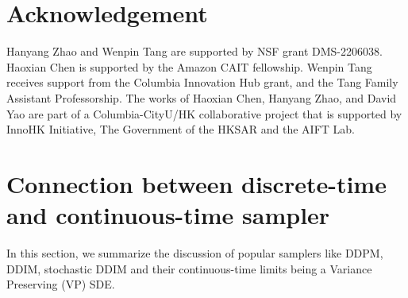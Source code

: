 \documentclass{article}
\theoremstyle{plain}
\theoremstyle{definition}
\theoremstyle{remark}
\begin{document}
\section*{Acknowledgement}
Hanyang Zhao and Wenpin Tang are supported by NSF grant DMS-2206038.
Haoxian Chen is supported by the Amazon CAIT fellowship.
Wenpin Tang receives support from the Columbia Innovation Hub grant,
and the Tang Family Assistant Professorship.
The works of Haoxian Chen, Hanyang Zhao, 
and David Yao are part of a Columbia-CityU/HK collaborative project that is supported by InnoHK
Initiative, The Government of the HKSAR and the AIFT Lab. 







\newpage
\appendix
\onecolumn

\section{Connection between discrete-time and continuous-time sampler}
In this section, we summarize the discussion of popular samplers like DDPM, DDIM, stochastic DDIM and their continuous-time limits being a Variance Preserving (VP) SDE.
\label{app:discrete and continuous sampler connection}
\end{document}
